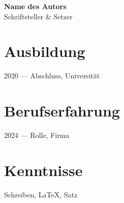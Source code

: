 \documentclass[11pt]{article}
\begin{document}
{\Large\bfseries Name des Autors}\\[4pt]
{\large Schriftsteller & Setzer}

\vspace{8pt}

\section*{Ausbildung}
2020 — Abschluss, Universität

\section*{Berufserfahrung}
2024 — Rolle, Firma

\section*{Kenntnisse}
Schreiben, LaTeX, Satz
\end{document}
